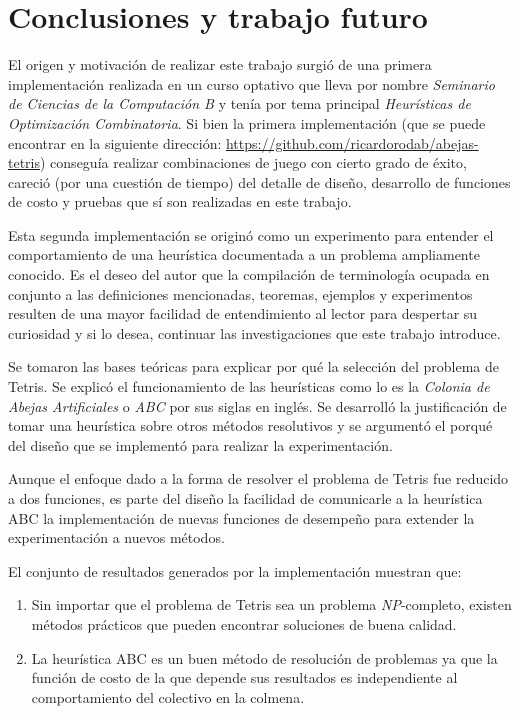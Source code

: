 \chapter{Conclusiones y trabajo futuro}

El origen y motivación de realizar este trabajo surgió de una primera 
implementación realizada en un curso optativo que lleva por nombre 
\textit{Seminario de Ciencias de la Computación B} y tenía por tema principal 
\textit{Heurísticas de Optimización Combinatoria}. 
Si bien la primera implementación (que se puede encontrar 
en la siguiente dirección: \url{https://github.com/ricardorodab/abejas-tetris}) 
conseguía realizar combinaciones de juego con cierto grado de éxito, 
careció (por una cuestión de tiempo) del detalle de diseño, desarrollo de funciones 
de costo y pruebas que sí son realizadas en este trabajo.

Esta segunda implementación se originó como un experimento para entender el comportamiento 
de una heurística documentada a un problema ampliamente conocido. 
Es el deseo del autor que la compilación de terminología ocupada en conjunto a 
las definiciones mencionadas, teoremas, ejemplos y experimentos resulten 
de una mayor facilidad de entendimiento al lector para despertar su curiosidad 
y si lo desea, continuar las investigaciones que este trabajo introduce.

Se tomaron las bases teóricas para explicar por qué la selección del problema 
de Tetris. Se explicó el funcionamiento de las heurísticas como 
lo es la \textit{Colonia de Abejas Artificiales} o 
\textit{ABC} por sus siglas en inglés. Se desarrolló 
la justificación de tomar una heurística sobre otros métodos resolutivos y se argumentó  
el porqué del diseño que se implementó para realizar la experimentación.

Aunque el enfoque dado a la forma de resolver el problema de Tetris fue 
reducido a dos funciones, es parte del diseño la facilidad de comunicarle 
a la heurística ABC la implementación de nuevas 
funciones de desempeño para extender la experimentación a nuevos métodos. 

El conjunto de resultados generados por la implementación muestran que: 

\begin{enumerate}

\item Sin importar que el problema de Tetris sea un problema \textsl{NP}-completo, 
existen métodos prácticos que pueden encontrar soluciones de buena calidad.

\item La heurística ABC es un buen método de resolución de problemas ya  
que la función de costo de la que depende sus resultados es independiente al 
comportamiento del colectivo en la colmena.

\end{enumerate}

